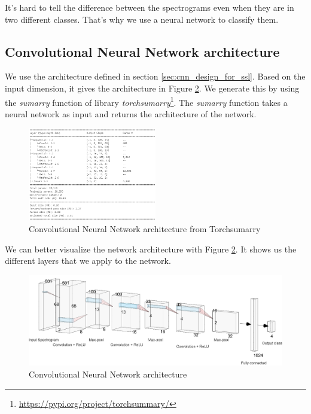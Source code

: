 It's hard to tell the difference between the spectrograms even when they are in two different classes. That's why we use a neural network to classify them.

\subsection{Convolutional Neural Network architecture}

We use the architecture defined in section \ref{sec:cnn_design_for_ssl}. Based on the input dimension, it gives the architecture in Figure \ref{fig:cnn_architecture}. We generate this by using the \textit{sumarry} function of library \textit{torchsumarry}\footnote{\url{https://pypi.org/project/torchsummary/}}. The \textit{sumarry} function takes a neural network as input and returns the architecture of the network.

\begin{figure}[H]
    \centering
    \includegraphics[width=0.5\textwidth]{images/ascii_model_architecture.png}
    \caption{Convolutional Neural Network architecture from Torchsumarry}
    \label{fig:cnn_architecture}
\end{figure}

We can better visualize the network architecture with Figure \ref{fig:cnn_architecture}. It shows us the different layers that we apply to the network. 

\begin{figure}[H]
    \centering
    \includegraphics[width=1\textwidth]{images/tm_cnn_with_names.drawio.png}
    \caption{Convolutional Neural Network architecture}
    \label{fig:cnn_architecture}
\end{figure}

